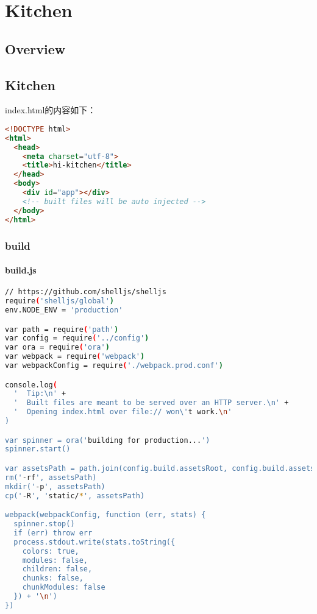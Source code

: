 \part{Kitchen}

\chapter{Overview}



\chapter{Kitchen}

index.html的内容如下：


\begin{lstlisting}[language=HTML]
<!DOCTYPE html>
<html>
  <head>
    <meta charset="utf-8">
    <title>hi-kitchen</title>
  </head>
  <body>
    <div id="app"></div>
    <!-- built files will be auto injected -->
  </body>
</html>
\end{lstlisting}


\section{build}


\subsection{build.js}


\begin{lstlisting}[language=bash]
// https://github.com/shelljs/shelljs
require('shelljs/global')
env.NODE_ENV = 'production'

var path = require('path')
var config = require('../config')
var ora = require('ora')
var webpack = require('webpack')
var webpackConfig = require('./webpack.prod.conf')

console.log(
  '  Tip:\n' +
  '  Built files are meant to be served over an HTTP server.\n' +
  '  Opening index.html over file:// won\'t work.\n'
)

var spinner = ora('building for production...')
spinner.start()

var assetsPath = path.join(config.build.assetsRoot, config.build.assetsSubDirectory)
rm('-rf', assetsPath)
mkdir('-p', assetsPath)
cp('-R', 'static/*', assetsPath)

webpack(webpackConfig, function (err, stats) {
  spinner.stop()
  if (err) throw err
  process.stdout.write(stats.toString({
    colors: true,
    modules: false,
    children: false,
    chunks: false,
    chunkModules: false
  }) + '\n')
})
\end{lstlisting}

